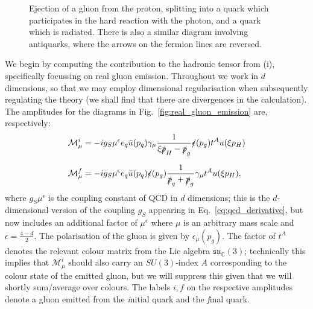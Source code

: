 \documentclass[withindex,glossary]{cam-thesis}
\begin{document}
\begin{figure}
\centering
{}
\caption{Ejection of a gluon from the proton, splitting into a quark which participates in the hard reaction with the photon, and a quark which is radiated. There is also a similar diagram involving antiquarks, where the arrows on the fermion lines are reversed.}
\label{fig:gluon_boson_fusion}
\end{figure}

We begin by computing the contribution to the hadronic tensor from (i), specifically focussing on real gluon emission. Throughout we work in $d$ dimensions, so that we may employ dimensional regularisation when subsequently regulating the theory (we shall find that there are divergences in the calculation). The amplitudes for the diagrams in Fig.~\ref{fig:real_gluon_emission} are, respectively:
\begin{align}
\mathcal{M}_{\mu}^i &= -i g_S \mu^{\epsilon} e_q \bar{u}(p_{q}) \gamma_{\mu} \frac{1}{\xi \slashed{p}_H - \slashed{p}_{g}}\slashed{\epsilon}(p_{g}) t^A u(\xi p_H)  \\[1.5ex]
\mathcal{M}_{\mu}^f &= -i g_S \mu^{\epsilon} e_q \bar{u}(p_q) \slashed{\epsilon}(p_g) \frac{1}{\slashed{p}_q + \slashed{p}_g} \gamma_{\mu} t^A u(\xi p_H),
\end{align}
where $g_S\mu^{\epsilon}$ is the coupling constant of QCD in $d$ dimensions; this is the $d$-dimensional version of the coupling $g_S$ appearing in Eq.~\eqref{eq:qcd_derivative}, but now includes an additional factor of $\mu^{\epsilon}$ where $\mu$ is an arbitrary mass scale and $\epsilon = \frac{4 - d}{2}$. The polarisation of the gluon is given by $\epsilon_{\mu}(p_g)$. The factor of $t^A$ denotes the relevant colour matrix from the Lie algebra $\mathfrak{su}_{\mathbb{C}}(3)$; technically this implies that $\mathcal{M}_{\mu}^i$ should also carry an $SU(3)$-index $A$ corresponding to the colour state of the emitted gluon, but we will suppress this given that we will shortly sum/average over colours. The labels $i,f$ on the respective amplitudes denote a gluon emitted from the \textit{i}nitial quark and the \textit{f}inal quark.
\end{document}
